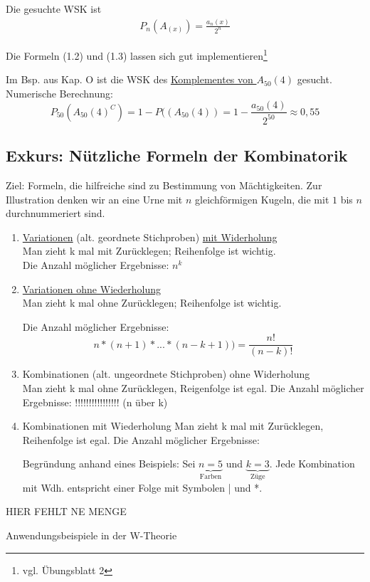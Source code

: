 \documentclass[10pt,a4paper,titlepage]{book}
\begin{document}
Die gesuchte WSK ist
\begin{align}
P_n(A_(x)) = \frac{a_n(x)}{2^n}
\end{align}

Die Formeln (1.2) und (1.3) lassen sich gut implementieren\footnote{vgl. Übungsblatt 2}

Im Bsp. aus Kap. O ist die WSK des \underline{Komplementes von $A_{50}(4)$} gesucht.
Numerische Berechnung: $$P_50(A_{50}(4)^C) = 1-P((A_{50}(4)) = 1-\frac{a_{50}(4)}{2^50} \approx 0,55$$

\subsection{Exkurs: Nützliche Formeln der Kombinatorik}
Ziel: Formeln, die hilfreiche sind zu Bestimmung von Mächtigkeiten.
Zur Illustration denken wir an eine Urne mit $n$ gleichförmigen Kugeln, die mit $1$ bis $n$ durchnummeriert sind.

\begin{enumerate}
\item \underline{Variationen} (alt. geordnete Stichproben) \underline{mit Widerholung}\\ 
Man zieht k mal mit Zurücklegen; Reihenfolge ist wichtig.\\
Die Anzahl möglicher Ergebnisse: \textbf{$n^k$}
\item \underline{Variationen ohne Wiederholung}\\
Man zieht k mal ohne Zurücklegen; Reihenfolge ist wichtig.

Die Anzahl möglicher Ergebnisse:
$$n*(n+1)*...*(n-k+1)) = \frac{n!}{(n-k)!}$$

\item Kombinationen (alt. ungeordnete Stichproben) ohne Widerholung\\
Man zieht k mal ohne Zurücklegen, Reigenfolge ist egal.
Die Anzahl möglicher Ergebnisse: !!!!!!!!!!!!!!!! (n über k)

\item Kombinationen mit Wiederholung
Man zieht k mal mit Zurücklegen, Reihenfolge ist egal.
Die Anzahl möglicher Ergebnisse:

Begründung anhand eines Beispiels:
Sei $\underbrace{n=5}_{\text{Farben}}$ und $\underbrace{k = 3}_{\text{Züge}}$.
Jede Kombination mit Wdh. entspricht einer Folge mit Symbolen | und *.
\end{enumerate}

HIER FEHLT NE MENGE

Anwendungsbeispiele in der W-Theorie
\end{document}
